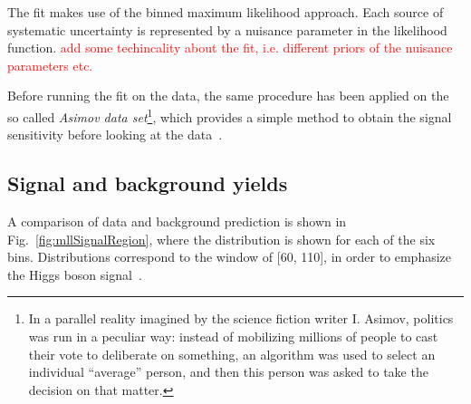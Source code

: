 The fit makes use of the binned maximum likelihood approach. Each source of systematic uncertainty is represented by a nuisance parameter in the likelihood function. \textcolor{red}{add some techincality about the fit, i.e. different priors of the nuisance parameters etc.}

Before running the fit on the data, the same procedure has been applied on the so called \textit{Asimov data set}\footnote{In a parallel reality imagined by the science fiction writer I. Asimov, politics was run in a peculiar way: instead of mobilizing millions of people to cast their vote to deliberate on something, an algorithm was used to select an individual ``average'' person, and then this person was asked to take the decision on that matter.}, which provides a simple method to obtain the signal sensitivity before looking at the data~\cite{Cowan:2010js}.


\subsection{Signal and background yields}\label{subsec:yields}


A comparison of data and background prediction is shown in
Fig.~\ref{fig:mllSignalRegion}, where the \mll{} distribution is shown for each of the six \pth{} bins. Distributions correspond to the \mt{} window of [60, 110]\GeV, in order to emphasize the Higgs boson signal~\cite{Chatrchyan:2013iaa}.

